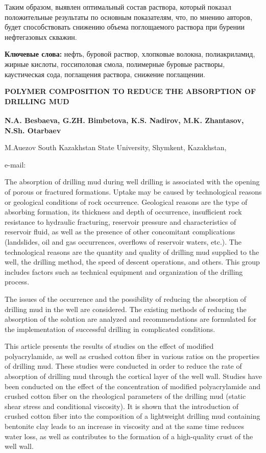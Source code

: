 Таким образом, выявлен оптимальный состав раствора, который показал
положительные результаты по основным показателям, что, по мнению
авторов, будет способствовать снижению объема поглощаемого раствора при
бурении нефтегазовых скважин.

{\bfseries Ключевые слова:} нефть, буровой раствор, хлопковые волокна,
полиакриламид, жирные кислоты, госсиполовая смола, полимерные буровые
растворы, каустическая сода, поглащения раствора, снижение поглащении.

\begin{articleheader}
{\bfseries POLYMER COMPOSITION TO REDUCE THE ABSORPTION OF DRILLING MUD}

{\bfseries
N.A. Besbaeva,
G.ZH. Bimbetova\textsuperscript{\envelope },
K.S. Nadirov,
M.K. Zhantasov,
N.Sh. Otarbaev
}
\end{articleheader}

\begin{affiliation}
M.Auezov South Kazakhstan State University, Shymkent, Kazakhstan,

e-mail: \href{mailto:gulmnaz@mail.ru}{}
\end{affiliation}

The absorption of drilling mud during well drilling is associated with
the opening of porous or fractured formations. Uptake may be caused by
technological reasons or geological conditions of rock occurrence.
Geological reasons are the type of absorbing formation, its thickness
and depth of occurrence, insufficient rock resistance to hydraulic
fracturing, reservoir pressure and characteristics of reservoir fluid,
as well as the presence of other concomitant complications (landslides,
oil and gas occurrences, overflows of reservoir waters, etc.). The
technological reasons are the quantity and quality of drilling mud
supplied to the well, the drilling method, the speed of descent
operations, and others. This group includes factors such as technical
equipment and organization of the drilling process.

The issues of the occurrence and the possibility of reducing the
absorption of drilling mud in the well are considered. The existing
methods of reducing the absorption of the solution are analyzed and
recommendations are formulated for the implementation of successful
drilling in complicated conditions.

This article presents the results of studies on the effect of modified
polyacrylamide, as well as crushed cotton fiber in various ratios on the
properties of drilling mud. These studies were conducted in order to
reduce the rate of absorption of drilling mud through the cortical layer
of the well wall. Studies have been conducted on the effect of the
concentration of modified polyacrylamide and crushed cotton fiber on the
rheological parameters of the drilling mud (static shear stress and
conditional viscosity). It is shown that the introduction of crushed
cotton fiber into the composition of a lightweight drilling mud
containing bentonite clay leads to an increase in viscosity and at the
same time reduces water loss, as well as contributes to the formation of
a high-quality crust of the well wall.

